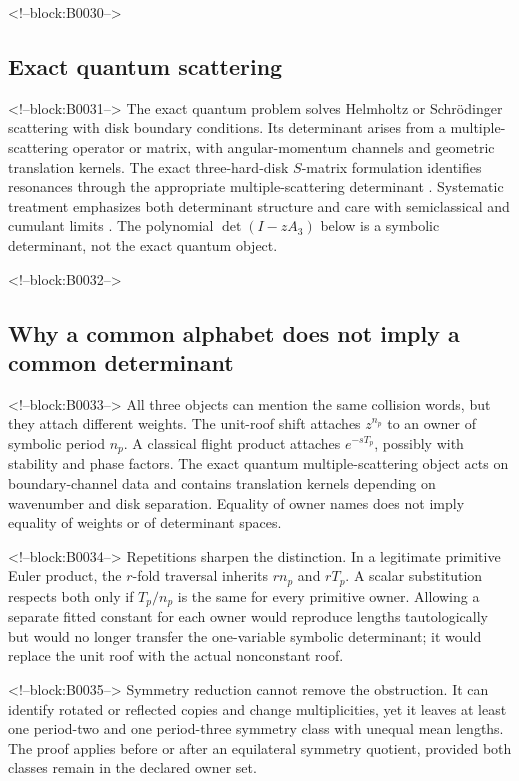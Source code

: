 \documentclass[11pt,a4paper]{article}
\theoremstyle{definition}
\theoremstyle{remark}
\begin{document}
<!--block:B0030-->
\subsection{Exact quantum scattering}

<!--block:B0031-->
The exact quantum problem solves Helmholtz or Schrödinger scattering with disk boundary conditions. Its determinant arises from a multiple-scattering operator or matrix, with angular-momentum channels and geometric translation kernels.
The exact three-hard-disk \(S\)-matrix formulation identifies resonances through the appropriate multiple-scattering determinant \citep[abstract and Secs.~II--III]{GaspardRice1989Exact}.
Systematic treatment emphasizes both determinant structure and care with semiclassical and cumulant limits \citep[Secs.~4--6]{Wirzba1999}. The polynomial \(\det(I-zA_3)\) below is a symbolic determinant, not the exact quantum object.

<!--block:B0032-->
\subsection{Why a common alphabet does not imply a common determinant}

<!--block:B0033-->
All three objects can mention the same collision words, but they attach different weights. The unit-roof shift attaches \(z^{n_p}\) to an owner of symbolic period \(n_p\). A classical flight product attaches \(e^{-sT_p}\), possibly with stability and phase factors. The exact quantum multiple-scattering object acts on boundary-channel data and contains translation kernels depending on wavenumber and disk separation. Equality of owner names does not imply equality of weights or of determinant spaces.

<!--block:B0034-->
Repetitions sharpen the distinction. In a legitimate primitive Euler product, the \(r\)-fold traversal inherits \(rn_p\) and \(rT_p\). A scalar substitution respects both only if \(T_p/n_p\) is the same for every primitive owner. Allowing a separate fitted constant for each owner would reproduce lengths tautologically but would no longer transfer the one-variable symbolic determinant; it would replace the unit roof with the actual nonconstant roof.

<!--block:B0035-->
Symmetry reduction cannot remove the obstruction. It can identify rotated or reflected copies and change multiplicities, yet it leaves at least one period-two and one period-three symmetry class with unequal mean lengths. The proof applies before or after an equilateral symmetry quotient, provided both classes remain in the declared owner set.
\end{document}
